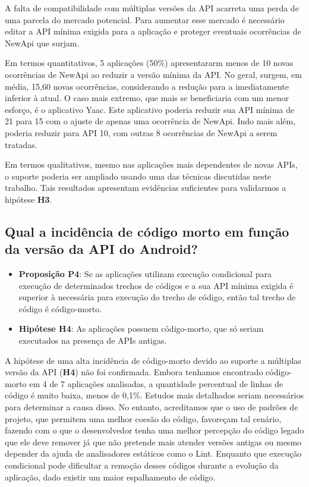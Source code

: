A falta de compatibilidade com múltiplas versões da API acarreta uma perda de uma
parcela do mercado potencial. Para aumentar esse mercado é necessário editar a API
mínima exigida para a aplicação e proteger eventuais ocorrências de NewApi que surjam.

Em termos quantitativos, 5 aplicações (50\%) apresentararm menos de 10 novas ocorrências 
de NewApi ao reduzir a versão mínima da API. No geral, surgem, em média, 15,60 novas
ocorrências, considerando a redução para a imediatamente inferior à atual. O caso mais
extremo, que mais se beneficiaria com um menor esforço, é o aplicativo Yaac. Este aplicativo
poderia reduzir sua API mínima de 21 para 15 com o ajuste de apenas uma ocorrência de NewApi.
Indo mais além, poderia reduzir para API 10, com outras 8 ocorrências de NewApi a serem tratadas.

Em termos qualitativos, mesmo nas aplicações mais dependentes de novas APIs, o suporte
poderia ser ampliado usando uma das técnicas discutidas neste trabalho. Tais resultados
apresentam evidências suficientes para validarmos a hipótese \textbf{H3}. 

\subsection{Qual a incidência de código morto em função da versão da API do Android?} 
\label{subsec:codigo_morto}

\begin{itemize}
	\item \textbf{Proposição P4}: Se as aplicações utilizam execução condicional para
	execução de determinados trechos de códigos e a sua API mínima exigida é superior
	à necessária para execução do trecho de código, então tal trecho de código é código-morto.   
	\item \textbf{Hipótese H4}: As aplicações possuem código-morto, que só seriam executados
	na presença de APIs antigas.
\end{itemize}

A hipótese de uma alta incidência de código-morto devido ao suporte a
múltiplas versão da API (\textbf{H4}) não foi confirmada. Embora tenhamos encontrado
código-morto em 4 de 7 aplicações analisadas, a quantidade percentual de linhas de
código é muito baixa,
menos de 0,1\%. Estudos mais detalhados seriam necessários para determinar a causa
disso. No entanto, acreditamos que o uso de padrões de projeto, que permitem uma melhor
coesão do código, favoreçam tal cenário, fazendo com o que o desenvolvedor tenha uma melhor
percepção do código legado que ele deve remover já que não pretende mais atender versões
antigas ou mesmo depender da ajuda de analisadores estáticos como o Lint. Enquanto que
execução condicional pode dificultar a remoção desses códigos durante a evolução da
aplicação, dado existir um maior espalhamento de código.

